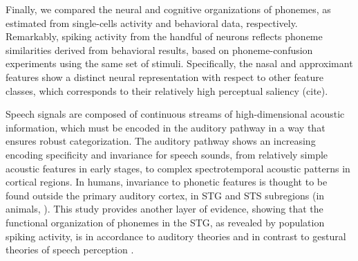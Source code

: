 Finally, we compared the neural and cognitive organizations of phonemes, as estimated from single-cells activity and behavioral data, respectively. Remarkably, spiking activity from the handful of neurons reflects phoneme similarities derived from behavioral results, based on phoneme-confusion experiments using the same set of stimuli. Specifically, the nasal and approximant features show a distinct neural representation with respect to other feature classes, which corresponds to their relatively high perceptual saliency (cite).

Speech signals are composed of continuous streams of high-dimensional acoustic information, which must be encoded in the auditory pathway in a way that ensures robust categorization. The auditory pathway shows an increasing encoding specificity and invariance for speech sounds, from relatively simple acoustic features in early stages, to complex spectrotemporal acoustic patterns in cortical regions. In humans, invariance to phonetic features is thought to be found outside the primary auditory cortex, in STG and STS subregions \citep{Dewitt2012} (in animals, \citealp[see]{mesgarani2008phoneme}). This study provides another layer of evidence, showing that the functional organization of phonemes in the STG, as revealed by population spiking activity, is in accordance to auditory theories and in contrast to gestural theories of speech perception \citep{liberman1985motor, browman1992articulatory}.